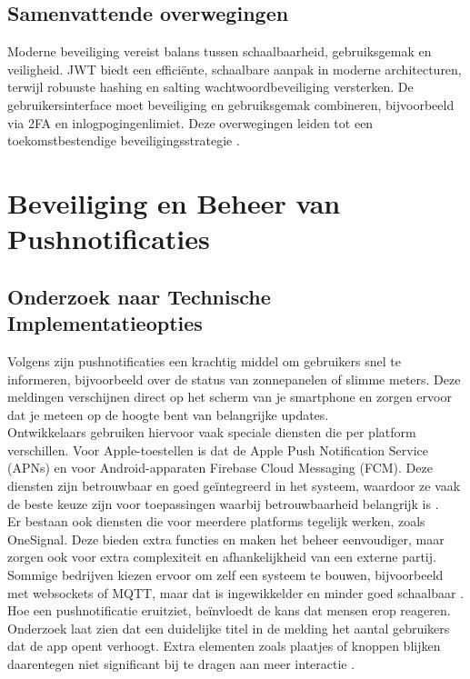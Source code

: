\subsection{Samenvattende overwegingen}
Moderne beveiliging vereist balans tussen schaalbaarheid, gebruiksgemak en veiligheid. JWT biedt een efficiënte, schaalbare aanpak in moderne architecturen, terwijl robuuste hashing en salting wachtwoordbeveiliging versterken. De gebruikersinterface moet beveiliging en gebruiksgemak combineren, bijvoorbeeld via 2FA en inlogpogingenlimiet. Deze overwegingen leiden tot een toekomstbestendige beveiligingsstrategie \autocite{Gao2023, Gupta2022, Arias2025, ReesCarter2024, Chinnasamy2025, Jurisons2024}.

\section{Beveiliging en Beheer van Pushnotificaties}

\subsection{Onderzoek naar Technische Implementatieopties}
Volgens \textcite{Wohllebe2021} zijn pushnotificaties een krachtig middel om gebruikers snel te informeren, bijvoorbeeld over de status van zonnepanelen of slimme meters. Deze meldingen verschijnen direct op het scherm van je smartphone en zorgen ervoor dat je meteen op de hoogte bent van belangrijke updates.\\

Ontwikkelaars gebruiken hiervoor vaak speciale diensten die per platform verschillen. Voor Apple-toestellen is dat de Apple Push Notification Service (APNs) en voor Android-apparaten Firebase Cloud Messaging (FCM). Deze diensten zijn betrouwbaar en goed geïntegreerd in het systeem, waardoor ze vaak de beste keuze zijn voor toepassingen waarbij betrouwbaarheid belangrijk is \autocite{Wohllebe2021}.\\

Er bestaan ook diensten die voor meerdere platforms tegelijk werken, zoals OneSignal. Deze bieden extra functies en maken het beheer eenvoudiger, maar zorgen ook voor extra complexiteit en afhankelijkheid van een externe partij. Sommige bedrijven kiezen ervoor om zelf een systeem te bouwen, bijvoorbeeld met websockets of MQTT, maar dat is ingewikkelder en minder goed schaalbaar \autocite{Wohllebe2021}.\\

Hoe een pushnotificatie eruitziet, beïnvloedt de kans dat mensen erop reageren. Onderzoek laat zien dat een duidelijke titel in de melding het aantal gebruikers dat de app opent verhoogt. Extra elementen zoals plaatjes of knoppen blijken daarentegen niet significant bij te dragen aan meer interactie \autocite{Wohllebe2021}.\\

